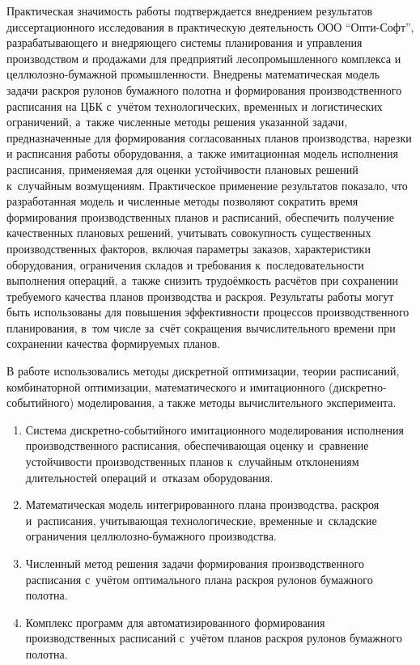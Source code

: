 Практическая значимость работы подтверждается внедрением результатов
диссертационного исследования в практическую деятельность ООО
``Опти-Софт'', разрабатывающего и внедряющего системы планирования и управления
производством и продажами для предприятий лесопромышленного комплекса и
целлюлозно-бумажной промышленности.
Внедрены математическая модель задачи раскроя рулонов бумажного полотна
и формирования производственного расписания на ЦБК с~учётом технологических, временных и
логистических ограничений, а~также численные методы решения указанной
задачи, предназначенные для формирования согласованных планов
производства, нарезки и расписания работы оборудования,
а~также имитационная модель исполнения расписания, применяемая для
оценки устойчивости плановых решений к~случайным возмущениям.
Практическое применение результатов показало, что разработанная модель и
численные методы позволяют сократить время формирования производственных
планов и расписаний, обеспечить получение качественных плановых решений,
учитывать совокупность существенных производственных факторов, включая
параметры заказов, характеристики оборудования, ограничения складов и
требования к~последовательности выполнения операций, а~также снизить
трудоёмкость расчётов при сохранении требуемого качества планов
производства и раскроя.
Результаты работы могут быть использованы для повышения эффективности
процессов производственного планирования, в~том числе за~счёт сокращения
вычислительного времени при сохранении качества формируемых планов.

{\methods}
В работе использовались методы дискретной оптимизации,
теории расписаний, комбинаторной оптимизации,
математического и имитационного (дискретно-событийного) моделирования,
а также методы вычислительного эксперимента.

{}
\begin{enumerate}[beginpenalty=10000] %
  \item Система дискретно-событийного имитационного моделирования исполнения производственного расписания, обеспечивающая оценку и~сравнение устойчивости производственных планов к~случайным отклонениям длительностей операций и~отказам оборудования.
  \item Математическая модель интегрированного плана производства, раскроя и~расписания, учитывающая технологические, временные и~складские ограничения целлюлозно-бумажного производства.
  \item Численный метод решения задачи формирования производственного расписания с~учётом оптимального плана раскроя рулонов бумажного полотна.
  \item Комплекс программ для автоматизированного формирования производственных расписаний с~учётом планов раскроя рулонов бумажного полотна.
\end{enumerate}

